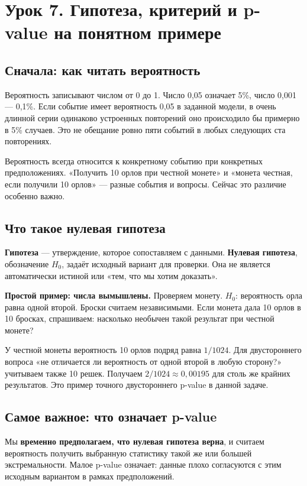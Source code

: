 \documentclass[12pt,a4paper]{article}
\newcommand{\toy}[1]{\par\textbf{Простой пример: числа вымышлены.} #1\par}
\begin{document}
\section{Урок 7. Гипотеза, критерий и p-value на понятном примере}

\subsection{Сначала: как читать вероятность}

Вероятность записывают числом от 0 до 1. Число 0,05 означает 5\%, число 0,001 --- 0,1\%. Если событие имеет вероятность 0,05 в заданной модели, в очень длинной серии одинаково устроенных повторений оно происходило бы примерно в 5\% случаев. Это не обещание ровно пяти событий в любых следующих ста повторениях.

Вероятность всегда относится к конкретному событию при конкретных предположениях. «Получить 10 орлов при честной монете» и «монета честная, если получили 10 орлов» --- разные события и вопросы. Сейчас это различие особенно важно.

\subsection{Что такое нулевая гипотеза}

\textbf{Гипотеза} --- утверждение, которое сопоставляем с данными. \textbf{Нулевая гипотеза}, обозначение $H_0$, задаёт исходный вариант для проверки. Она не является автоматически истиной или «тем, что мы хотим доказать».

\toy{Проверяем монету. $H_0$: вероятность орла равна одной второй. Броски считаем независимыми. Если монета дала 10 орлов в 10 бросках, спрашиваем: насколько необычен такой результат при честной монете?}

У честной монеты вероятность 10 орлов подряд равна $1/1024$. Для двустороннего вопроса «не отличается ли вероятность от одной второй в любую сторону?» учитываем также 10 решек. Получаем $2/1024\approx0{,}00195$ для столь же крайних результатов. Это пример точного двустороннего p-value в данной задаче.

\subsection{Самое важное: что означает p-value}

Мы \textbf{временно предполагаем, что нулевая гипотеза верна}, и считаем вероятность получить выбранную статистику такой же или большей экстремальности. Малое p-value означает: данные плохо согласуются с этим исходным вариантом в рамках предположений.
\end{document}
